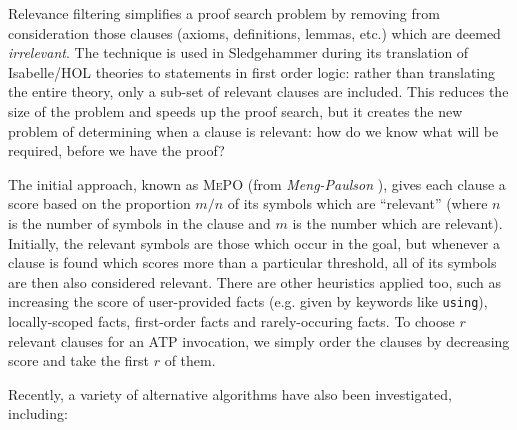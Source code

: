 Relevance filtering simplifies a proof search problem by removing from consideration those clauses (axioms, definitions, lemmas, etc.) which are deemed \emph{irrelevant}. The technique is used in Sledgehammer during its translation of Isabelle/HOL theories to statements in first order logic: rather than translating the entire theory, only a sub-set of relevant clauses are included. This reduces the size of the problem and speeds up the proof search, but it creates the new problem of determining when a clause is relevant: how do we know what will be required, before we have the proof?

The initial approach, known as \textsc{MePO} \iffalse TODO: Check name \fi (from \emph{Meng-Paulson} \citep{meng2009lightweight}), gives each clause a score based on the proportion $m / n$ of its symbols which are ``relevant'' (where $n$ is the number of symbols in the clause and $m$ is the number which are relevant). Initially, the relevant symbols are those which occur in the goal, but whenever a clause is found which scores more than a particular threshold, all of its symbols are then also considered relevant. There are other heuristics applied too, such as increasing the score of user-provided facts (e.g. given by keywords like \texttt{using}), locally-scoped facts, first-order facts and rarely-occuring facts. To choose $r$ relevant clauses for an ATP invocation, we simply order the clauses by decreasing score and take the first $r$ of them.

Recently, a variety of alternative algorithms have also been investigated, including:


